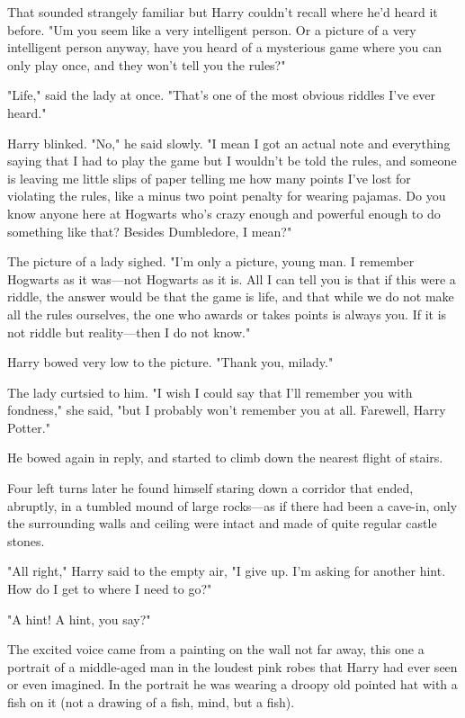 That sounded strangely familiar but Harry couldn't recall where he'd heard it
before. "Um{\el} you seem like a very intelligent person. Or a picture of a
very intelligent person{\el} anyway, have you heard of a mysterious game
where you can only play once, and they won't tell you the rules?"

"Life," said the lady at once. "That's one of the most obvious riddles I've
ever heard."

Harry blinked. "No," he said slowly. "I mean I got an actual note and
everything saying that I had to play the game but I wouldn't be told the rules,
and someone is leaving me little slips of paper telling me how many points I've
lost for violating the rules, like a minus two point penalty for wearing
pajamas. Do you know anyone here at Hogwarts who's crazy enough and powerful
enough to do something like that? Besides Dumbledore, I mean?"

The picture of a lady sighed. "I'm only a picture, young man. I remember
Hogwarts as it was---not Hogwarts as it is. All I can tell you is that if this
were a riddle, the answer would be that the game is life, and that while we do
not make all the rules ourselves, the one who awards or takes points is always
you. If it is not riddle but reality---then I do not know."

Harry bowed very low to the picture. "Thank you, milady."

The lady curtsied to him. "I wish I could say that I'll remember you with
fondness," she said, "but I probably won't remember you at all. Farewell, Harry
Potter."

He bowed again in reply, and started to climb down the nearest flight of stairs.

Four left turns later he found himself staring down a corridor that ended,
abruptly, in a tumbled mound of large rocks---as if there had been a cave-in,
only the surrounding walls and ceiling were intact and made of quite regular
castle stones.

"All right," Harry said to the empty air, "I give up. I'm asking for another
hint. How do I get to where I need to go?"

"A hint! A hint, you say?"

The excited voice came from a painting on the wall not far away, this one a
portrait of a middle-aged man in the loudest pink robes that Harry had ever
seen or even imagined. In the portrait he was wearing a droopy old pointed hat
with a fish on it (not a drawing of a fish, mind, but a fish).

